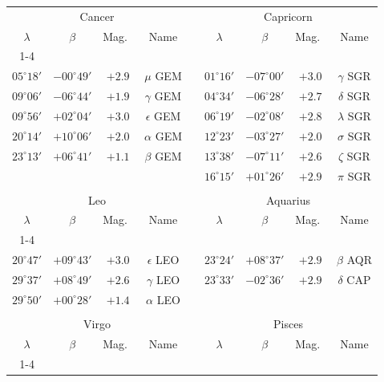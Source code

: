 \begin{table}[!h]
\vspace{0.25cm}
\centering
{\begin{tabular}{ccccccccc}
\multicolumn{4}{c}{Cancer} && \multicolumn{4}{c}{Capricorn}\\
$\lambda$ & $\beta$ & Mag.\ & Name  && $\lambda$ & $\beta$ & Mag.\ & Name \\\cline{1-4}\cline{6-9}
&&&&&&&&\\[-1.75ex]
$05^\circ 18'$ &   $-00^\circ 49'$ &  $+2.9$ &  $\mu$      GEM &&
$01^\circ 16'$ &  $-07^\circ 00'$ &   $+3.0$ & $\gamma$   SGR\\
$09^\circ 06'$ &  $-06^\circ 44'$ &  $+1.9$ &  $\gamma$   GEM &&
$04^\circ 34'$ &  $-06^\circ 28'$ &  $+2.7$  & $\delta$   SGR\\
$09^\circ 56'$ &  $+02^\circ 04'$ &  $+3.0$ &  $\epsilon$ GEM &&
$06^\circ 19'$ &  $-02^\circ 08'$ &  $+2.8$ &   $\lambda$  SGR\\
$20^\circ 14'$ & $+10^\circ 06'$ & $+2.0$ & $\alpha$ GEM &&
$12^\circ 23'$ &  $-03^\circ 27'$ &  $+2.0$  & $\sigma$   SGR\\
$23^\circ 13'$ &  $+06^\circ 41'$ &  $+1.1$ &  $\beta$    GEM &&
$13^\circ 38'$ &   $-07^\circ 11'$ &  $+2.6$ &  $\zeta$    SGR \\
&&&&&
$16^\circ 15'$  & $+01^\circ 26'$ &  $+2.9$ &  $\pi$      SGR\\
\multicolumn{8}{c}{}\\
\multicolumn{4}{c}{Leo} && \multicolumn{4}{c}{Aquarius}\\
$\lambda$ & $\beta$ & Mag.\ & Name  && $\lambda$ & $\beta$ & Mag.\ & Name \\\cline{1-4}\cline{6-9}
&&&&&&&&\\[-1.75ex]
$20^\circ 47'$ &  $+09^\circ 43'$ &  $+3.0$ &   $\epsilon$ LEO &&
$23^\circ 24'$ &   $+08^\circ 37'$ &   $+2.9$ &   $\beta$    AQR\\
$29^\circ 37'$ &  $+08^\circ 49'$ &  $+2.6$ &  $\gamma$  LEO &&
$23^\circ 33'$ &  $-02^\circ 36'$ &  $+2.9$ &  $\delta$   CAP\\
$29^\circ 50'$ &  $+00^\circ 28'$ &  $+1.4$ &  $\alpha$   LEO &&
&&&\\
\multicolumn{8}{c}{}\\
\multicolumn{4}{c}{Virgo} && \multicolumn{4}{c}{Pisces}\\
$\lambda$ & $\beta$ & Mag.\ & Name  && $\lambda$ & $\beta$ & Mag.\ & Name \\\cline{1-4}\cline{6-9}
&&&&&&&&\\[-1.75ex]

\end{tabular}}
\end{table}
